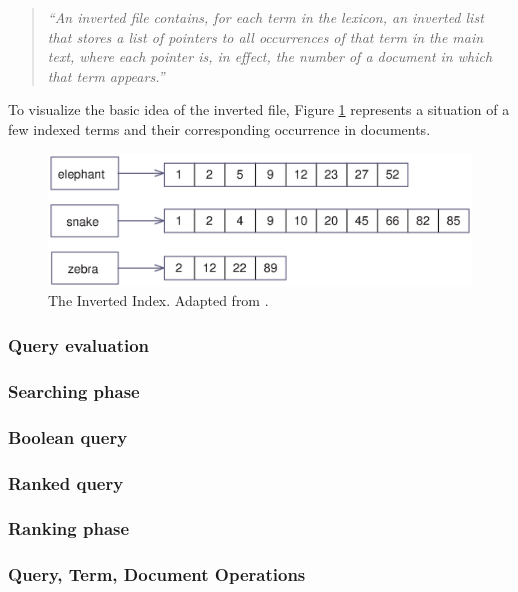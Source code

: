 \begin{quote}
		\textsl{``An inverted file contains, for each term in the lexicon, an inverted list that stores a list of pointers to all occurrences of that term in the main text, where each pointer is, in effect, the number of a document in which that term appears.''}
	\end{quote}
	
	To visualize the basic idea of the inverted file, Figure \ref{fig:inverted_index} represents a situation of a few indexed terms and their corresponding occurrence in documents.

\begin{figure}[h]
	\centering
		\includegraphics[scale=0.63]{figures/inverted_index.eps}
	\caption{The Inverted Index. Adapted from \cite{ManningRaghavanSchuetze08}.}
	\label{fig:inverted_index}
\end{figure}
	
\subsubsection{Query evaluation}

\subsubsection{Searching phase}


\subsubsection*{Boolean query}

\subsubsection*{Ranked query}


\subsubsection{Ranking phase}	


\subsubsection*{Query, Term, Document Operations}

